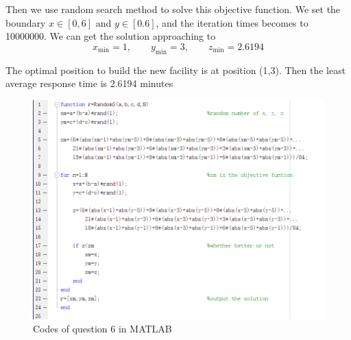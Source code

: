 \documentclass{report}
\begin{document}
\begin{spacing}{1.3541667}
\vspace{1em}
\hspace{-1.5em}{\bf Step 4. Solve the model}\par

Then we use random search method to solve this objective function. 
We set the boundary $x\in [0,6]$ and $y\in [0.6]$, and the iteration times becomes to 10000000. 
We can get the solution approaching to 
\begin{equation*}
    x_{\min}=1,\hspace{2em}
    y_{\min}=3,\hspace{2em}
    z_{\min}=2.6194
\end{equation*}

\vspace{1em}
\hspace{-1.5em}{\bf Step 5. Answer the question}\par

The optimal position to build the new facility is at position (1,3). 
Then the least average response time is 2.6194 minutes

\newpage
\begin{figure}[htbp]
    \centering
    \includegraphics[scale=0.9]{figs/2_1.jpg}
    \caption*{Codes of question 6 in MATLAB}
\end{figure}

\end{spacing}
\end{document}
